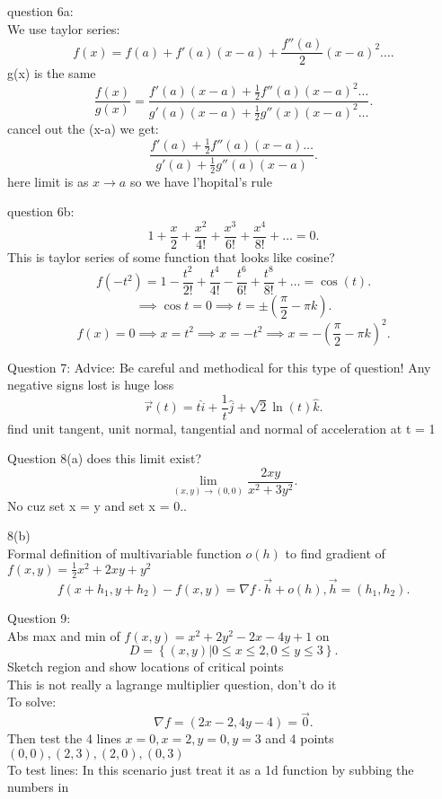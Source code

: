\begin{example}
	question 6a:\\
	We use taylor series:
	\[
	f\left( x \right)  = f(a) + f'(a) (x-a) + \frac{f''(a)}{2}(x-a)^2\ldots
	.\] 
	g(x) is the same\\
	 \[
	\frac{f(x)}{g(x)}=\frac{f'(a)(x-a) + \frac{1}{2}f''(a)(x-a)^2\ldots}{g'(a)(x-a) + \frac{1}{2}g''(x) (x-a)^2\ldots}
	.\] 
	cancel out the (x-a) we get:
	\[
	\frac{f'(a) + \frac{1}{2}f''(a) (x-a)\ldots}{g'(a) + \frac{1}{2}g''(a) (x-a)}
	.\] 
	here limit is as $x\to a$ so we have l'hopital's rule
\end{example}
\begin{example}
	question 6b:
	\[
	1 + \frac{x}{2} + \frac{x^2}{4!} + \frac{x^3}{6!} + \frac{x^4}{8!} + \ldots = 0
	.\] 
	This is taylor series of some function that looks like cosine?
	\[
	f(-t^2) = 1 - \frac{t^2}{2!} + \frac{t^4}{4!} - \frac{t^6}{6!} + \frac{t^8}{8!} + \ldots = \cos(t)
	.\] 
	\[
	\implies \cos t = 0 \implies t = \pm \left( \frac{\pi}{2}-\pi k \right) 
	.\] 
	\[
	f(x) = 0 \implies x = t^2 \implies x = -t^2 \implies x = -\left( \frac{\pi}{2} - \pi k \right) ^2
	.\] 
\end{example}
\begin{example}
	Question 7: Advice: Be careful and methodical for this type of question! Any negative signs lost is huge loss\\
	\[
	\vec{r}(t) = t\hat{i} + \frac{1}{t}\hat{j} + \sqrt{2} \ln(t) \hat{k}
	.\] 
	find unit tangent, unit normal, tangential and normal of acceleration at t = 1
\end{example}
\begin{example}
	Question 8(a) does this limit exist?
	\[
	\lim_{\left( x,y \right)  \to (0,0)} \frac{2xy}{x^2 + 3y^2} 
	.\] 
	No cuz set x = y and set x = 0..
\end{example}
\begin{example}
	8(b)\\
	Formal definition of multivariable function $o(h)$ to find gradient of $f\left( x,y \right)  = \frac{1}{2}x^2 + 2xy + y^2$\\
	\[
	f\left( x+h_1, y + h_2 \right)  - f\left( x,y \right)  = \nabla f \cdot  \vec{h} + o(h), \vec{h} = (h_1,h_2)
	.\] 
\end{example}
\begin{example}
	Question 9:\\
	Abs max and min of $f\left( x,y \right) = x^2 + 2y^2 - 2x - 4y + 1$ on
	\[
	D = \left\{ (x,y) | 0 \le x \le  2, 0 \le  y \le  3 \right\} 
	.\] 
	Sketch region and show locations of critical points\\
	This is not really a lagrange multiplier question, don't do it\\
	To solve:
	\[
	\nabla f = \left( 2x - 2, 4y - 4 \right)  = \vec{0}
	.\] 
	Then test the 4 lines  $ x = 0, x = 2, y = 0, y = 3$ and 4 points  $(0,0), (2,3), (2,0), (0,3)$\\
	To test lines: In this scenario just treat it as a 1d function by subbing the numbers in
\end{example}
